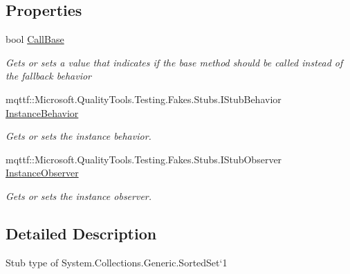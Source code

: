 \subsection*{Properties}
\begin{DoxyCompactItemize}
\item 
bool \hyperlink{class_system_1_1_collections_1_1_generic_1_1_fakes_1_1_stub_sorted_set_3_01_t_01_4_a939dbc1a11da3e24cc64f5a51608824b}{Call\-Base}
\begin{DoxyCompactList}\small\item\em Gets or sets a value that indicates if the base method should be called instead of the fallback behavior\end{DoxyCompactList}\item 
mqttf\-::\-Microsoft.\-Quality\-Tools.\-Testing.\-Fakes.\-Stubs.\-I\-Stub\-Behavior \hyperlink{class_system_1_1_collections_1_1_generic_1_1_fakes_1_1_stub_sorted_set_3_01_t_01_4_a1057d7c681a148b59f181354fef18e13}{Instance\-Behavior}
\begin{DoxyCompactList}\small\item\em Gets or sets the instance behavior.\end{DoxyCompactList}\item 
mqttf\-::\-Microsoft.\-Quality\-Tools.\-Testing.\-Fakes.\-Stubs.\-I\-Stub\-Observer \hyperlink{class_system_1_1_collections_1_1_generic_1_1_fakes_1_1_stub_sorted_set_3_01_t_01_4_a0fb97ef60915f05323a9673afcae035c}{Instance\-Observer}
\begin{DoxyCompactList}\small\item\em Gets or sets the instance observer.\end{DoxyCompactList}\end{DoxyCompactItemize}


\subsection{Detailed Description}
Stub type of System.\-Collections.\-Generic.\-Sorted\-Set`1



